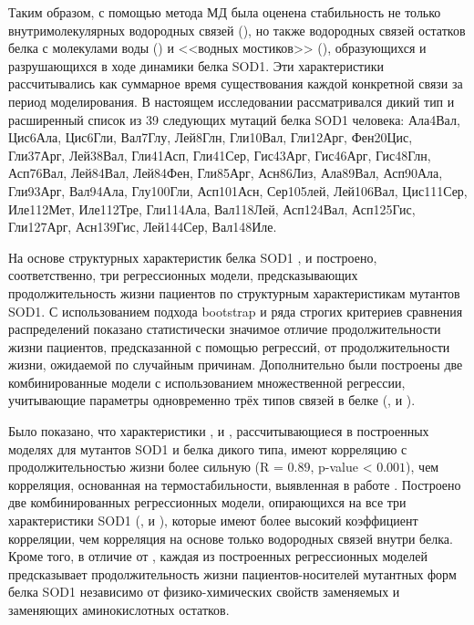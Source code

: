 Таким образом, с помощью метода МД была оценена стабильность не только внутримолекулярных водородных связей (\modelpphb{}), но также водородных связей остатков белка с молекулами воды (\modelpwhb{}) и <<водных мостиков>> (\modelwbr{}), образующихся и разрушающихся в ходе динамики белка SOD1. Эти характеристики рассчитывались как суммарное время существования каждой конкретной связи за период моделирования. В настоящем исследовании рассматривался дикий тип и расширенный список из 39 следующих мутаций белка SOD1 человека: Ала4Вал, Цис6Ала, Цис6Гли, Вал7Глу, Лей8Глн, Гли10Вал, Гли12Арг, Фен20Цис, Гли37Арг, Лей38Вал, Гли41Асп, Гли41Сер, Гис43Арг, Гис46Арг, Гис48Глн, Асп76Вал, Лей84Вал, Лей84Фен, Гли85Арг, Асн86Лиз, Ала89Вал, Асп90Ала, Гли93Арг, Вал94Ала, Глу100Гли, Асп101Асн, Сер105лей, Лей106Вал, Цис111Сер, Иле112Мет, Иле112Тре, Гли114Ала, Вал118Лей, Асп124Вал, Асп125Гис, Гли127Арг, Асн139Гис, Лей144Сер, Вал148Иле. 

На основе структурных характеристик белка SOD1 \modelpphb{}, \modelpwhb{} и \modelwbr{} построено, соответственно, три регрессионных модели, предсказывающих продолжительность жизни пациентов по структурным характеристикам мутантов SOD1. С использованием подхода bootstrap \cite{Efron1979} и ряда строгих критериев сравнения распределений показано статистически значимое отличие продолжительности жизни пациентов, предсказанной с помощью регрессий, от продолжительности жизни, ожидаемой по случайным причинам. Дополнительно были построены две комбинированные модели с использованием множественной регрессии, учитывающие параметры одновременно трёх типов связей в белке (\modelpphb{}, \modelpwhb{} и \modelwbr{}). 

Было показано, что характеристики \modelpphb{}, \modelpwhb{} и \modelwbr{}, рассчитывающиеся в построенных моделях для мутантов SOD1 и белка дикого типа, имеют корреляцию с продолжительностью жизни более сильную (R = $0.89$, p-value < $0.001$), чем корреляция, основанная на термостабильности, выявленная в работе \cite{Bystrom2010}. Построено две комбинированных регрессионных модели, опирающихся на все три характеристики SOD1 (\modelpphb{}, \modelpwhb{} и \modelwbr{}), которые имеют более высокий коэффициент корреляции, чем корреляция на основе только водородных связей внутри белка. Кроме того, в отличие от \cite{Bystrom2010}, каждая из построенных регрессионных моделей предсказывает продолжительность жизни пациентов-носителей мутантных форм белка SOD1 независимо от физико-химических свойств заменяемых и заменяющих аминокислотных остатков.

